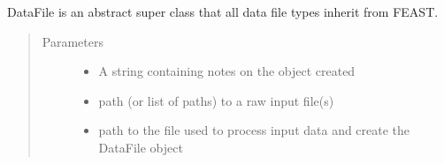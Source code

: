 \documentclass[letterpaper,10pt,english]{sphinxmanual}
\begin{document}
\begin{fulllineitems}
\label{\detokenize{index:feast.input_data_classes.DataFile}}
DataFile is an abstract super class that all data file types inherit from FEAST.
\begin{quote}\begin{description}
\item[{Parameters}] \leavevmode\begin{itemize}
\item {} 
 \textendash{} A string containing notes on the object created

\item {} 
 \textendash{} path (or list of paths) to a raw input file(s)

\item {} 
 \textendash{} path to the file used to process input data and create the DataFile object

\end{itemize}

\end{description}\end{quote}

\end{fulllineitems}

\end{document}
